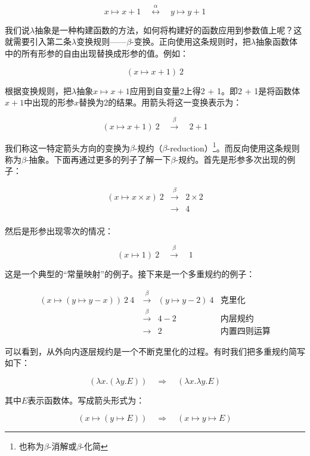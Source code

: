 \documentclass[UTF8]{article}
\begin{document}
\[
x \mapsto x + 1 \quad \overset{\alpha}{\longleftrightarrow} \quad y \mapsto y + 1
\]

我们说$\lambda$抽象是一种构建函数的方法，如何将构建好的函数应用到参数值上呢？这就需要引入第二条$\lambda$变换规则——$\beta$-变换。正向使用这条规则时，把$\lambda$抽象函数体中的所有形参的自由出现替换成形参的值。例如：

\[
(x \mapsto x + 1)\ 2
\]

根据变换规则，把$\lambda$抽象$x \mapsto x + 1$应用到自变量2上得2 + 1。即2 + 1是将函数体$x + 1$中出现的形参$x$替换为2的结果。用箭头将这一变换表示为：

\[
(x \mapsto x + 1)\ 2 \quad \overset{\beta}{\longrightarrow} \quad 2 + 1
\]

我们称这一特定箭头方向的变换为$\beta$-规约（$\beta$-reduction）\footnote{也称为$\beta$-消解或$\beta$-化简}。而反向使用这条规则称为$\beta$-抽象。下面再通过更多的列子了解一下$\beta$-规约。首先是形参多次出现的例子：

\[
\begin{array}{rcl}
(x \mapsto x \times x)\ 2 & \overset{\beta}{\longrightarrow} & 2 \times 2 \\
                          & \longrightarrow & 4 \\
\end{array}
\]

然后是形参出现零次的情况：

\[
(x \mapsto 1)\ 2 \quad \overset{\beta}{\longrightarrow} \quad 1
\]

这是一个典型的“常量映射”的例子。接下来是一个多重规约的例子：

\[
\begin{array}{rcll}
(x \mapsto (y \mapsto y - x))\ 2\ 4\ & \overset{\beta}{\longrightarrow} & (y \mapsto y - 2)\ 4 & \text{克里化} \\
                                     & \overset{\beta}{\longrightarrow} & 4 - 2 & \text{内层规约} \\
                                     & \longrightarrow & 2 & \text{内置四则运算}
\end{array}
\]

可以看到，从外向内逐层规约是一个不断克里化的过程。有时我们把多重规约简写如下：

\[
(\lambda x . (\lambda y . E)) \quad \Rightarrow \quad (\lambda x . \lambda y . E)
\]

其中$E$表示函数体。写成箭头形式为：

\[
(x \mapsto (y \mapsto E)) \quad \Rightarrow \quad (x \mapsto y \mapsto E)
\]
\end{document}
